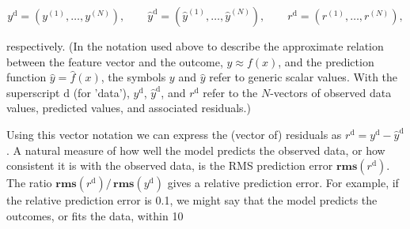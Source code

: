 \[y^{\mathrm{d}}=(y^{(1)},\dots,y^{(N)}),\qquad\hat{y}^{\mathrm{d}}=(\hat{y}^{( 1)},\dots,\hat{y}^{(N)}),\qquad r^{\mathrm{d}}=(r^{(1)},\dots,r^{(N)}),\]

respectively. (In the notation used above to describe the approximate relation between the feature vector and the outcome, \(y\approx f(x)\), and the prediction function \(\hat{y}=\hat{f}(x)\), the symbols \(y\) and \(\hat{y}\) refer to generic scalar values. With the superscript \(\mathrm{d}\) (for 'data'), \(y^{\mathrm{d}}\), \(\hat{y}^{\mathrm{d}}\), and \(r^{\mathrm{d}}\) refer to the \(N\)-vectors of observed data values, predicted values, and associated residuals.)

Using this vector notation we can express the (vector of) residuals as \(r^{\mathrm{d}}=y^{\mathrm{d}}-\hat{y}^{\mathrm{d}}\). A natural measure of how well the model predicts the observed data, or how consistent it is with the observed data, is the RMS prediction error \(\mathbf{rms}(r^{\mathrm{d}})\). The ratio \(\mathbf{rms}(r^{\mathrm{d}})/\,\mathbf{rms}(y^{\mathrm{d}})\) gives a relative prediction error. For example, if the relative prediction error is 0.1, we might say that the model predicts the outcomes, or fits the data, within 10%

 